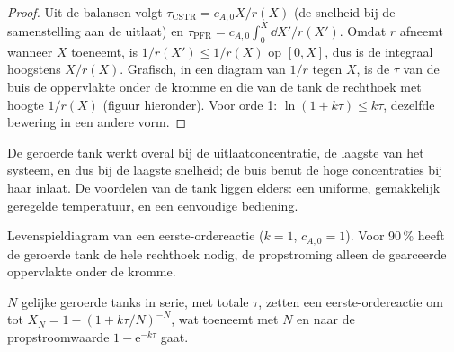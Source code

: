 \begin{proof}
Uit de balansen volgt $\tau_{\text{CSTR}} = c_{A,0}X/r(X)$ (de snelheid bij de samenstelling
aan de uitlaat) en $\tau_{\text{PFR}} = c_{A,0}\int_0^X\dd X'/r(X')$. Omdat $r$
afneemt wanneer $X$ toeneemt, is $1/r(X') \leq 1/r(X)$ op $[0, X]$, dus is de
integraal hoogstens $X/r(X)$. Grafisch, in een diagram van $1/r$ tegen $X$, is de
$\tau$ van de buis de oppervlakte onder de kromme en die van de tank de rechthoek met
hoogte $1/r(X)$ (figuur hieronder). Voor orde 1: $\ln(1 + k\tau) \leq k\tau$,
dezelfde bewering in een andere vorm.
\end{proof}

De geroerde tank werkt overal bij de uitlaatconcentratie, de laagste van
het systeem, en dus bij de laagste snelheid; de buis benut de hoge concentraties
bij haar inlaat. De voordelen van de tank liggen elders: een uniforme, gemakkelijk geregelde
temperatuur, en een eenvoudige bediening.

\begin{omfigure}

{\small Levenspieldiagram van een eerste-ordereactie ($k = 1$, $c_{A,0} = 1$).
Voor 90\,\%  heeft de geroerde tank de hele rechthoek nodig, de propstroming
alleen de gearceerde oppervlakte onder de kromme.}
\end{omfigure}

\begin{proposition}\label{prop:b2:continuous-reactors:cascade}
$N$ gelijke geroerde tanks in serie, met totale  $\tau$, zetten een
eerste-ordereactie om tot $X_N = 1 - (1 + k\tau/N)^{-N}$, wat toeneemt met
$N$ en naar de propstroomwaarde $1 - \mathrm e^{-k\tau}$ gaat.
\end{proposition}

